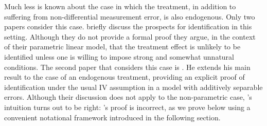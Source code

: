 Much less is known about the case in which the treatment, in addition to suffering from non-differential measurement error, is also endogenous.
Only two papers consider this case.
\cite{FL} briefly discuss the prospects for identification in this setting.
Although they do not provide a formal proof they argue, in the context of their parametric linear model, that the treatment effect is unlikely to be identified unless one is willing to impose strong and somewhat unnatural conditions. 
The second paper that considers this case is \cite{Mahajan}.
He extends his main result to the case of an endogenous treatment, providing an explicit proof of identification under the usual IV assumption in a model with additively separable errors.
Although their discussion does not apply to the non-parametric case, \citeauthor{FL}'s intuition turns out to be right: \citeauthor{Mahajan}'s proof is incorrect, as we prove below using a convenient notational framework introduced in the following section.
